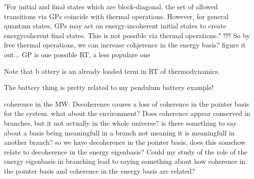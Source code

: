 \documentclass{article}
\begin{document}
"For initial and final states which are block-diagonal, the set of allowed transitions via GPs coincide with thermal operations. However, for general quantum states, GPs may act on energy-incoherent initial states to create energycoherent final states. This is not possible via thermal operations."
!!!! So by free thermal operations, we can increase cohjerence in the energy basis? figure it out...
GP is one possible RT, a less populare one

Note that b attery is an already loaded term in RT of thermodynamics.

The battery thing is pretty related to my pendulum battery example!

coherence in the MW: Decoherence causes a loss of coherence in the pointer basis for the system. what about the environment? 
Does coherence appear conserved in branches, but it not actually in the whole universe? is there something to say about a basis being meaningfull in a branch not meaning it is meaningfull in another branch?
so we have decoherence in the pointer basis, does this somehow relate to decoherence in the energy eigenbasis? Could my study of the role of the energy eigenbasis in branching lead to saying something about how coherence in the pointer basis and coherence in the energy basis are related?
\end{document}
